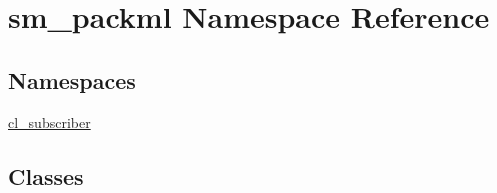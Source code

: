 \hypertarget{namespacesm__packml}{}\section{sm\+\_\+packml Namespace Reference}
\label{namespacesm__packml}
\subsection*{Namespaces}
\begin{DoxyCompactItemize}
\item 
 \hyperlink{namespacesm__packml_1_1cl__subscriber}{cl\+\_\+subscriber}
\end{DoxyCompactItemize}
\subsection*{Classes}
